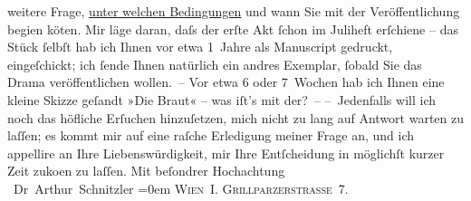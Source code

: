 \begin{ledgroupsized}[t]{13cm}
                    weitere Frage, \uline{unter welchen Bedingungen}{ }{\pb}und wann Sie mit der Veröffentlichung begi{\geminationn}en kö{\geminationn}ten. Mir läge
                    daran, daſs der erſte Akt ſchon im Juliheft erſchiene – das Stück ſelbſt hab ich
                         Ihnen vor etwa 1 Jahre als Manuscript
                    gedruckt, eingeſchickt; ich ſende Ihnen natürlich ein andres Exemplar, ſobald
                    Sie das Drama veröffentlichen wollen. –\pend
           \pstart
           Vor etwa 6 oder 7 Wochen hab {\pb}ich Ihnen eine kleine
                    Skizze geſandt »Die Braut« – was iſt’s mit
                    der? –\pend
           \pstart
           – Jedenfalls will ich noch das höfliche Erſuchen hinzuſetzen, mich nicht zu lang
                    auf Antwort warten zu laſſen; es kommt mir auf eine raſche Erledigung meiner
                    Frage an, und ich appellire an Ihre Liebenswürdigkeit, mir Ihre Entſcheidung in
                    möglichſt kurzer Zeit zu{\pb}ko{\geminationm}en zu laſſen.\pend
           \pstart
           Mit beſondrer Hochachtung{\\[\baselineskip]}\spacefill\mbox{ Dr Arthur Schnitzler}\pend
           \leftskip=0em{}\pstart
           \noindent{}\textsc{Wien I. Grillparzerstraße 7}.\pend
           \endnumbering{}\end{ledgroupsized}  \newcommand{\dateiname}{L00215}\newcommand{\titel}{Arthur Schnitzler an Wilhelm Bölsche, 1. 6. 1893}\newcommand{\editorInnen}{Martin Anton Müller und Gerd-Hermann Susen}
      